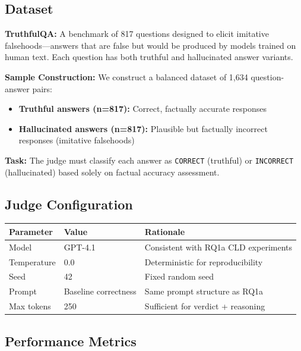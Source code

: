 \subsection{Dataset}

\textbf{TruthfulQA:} A benchmark of 817 questions designed to elicit imitative falsehoods---answers that are false but would be produced by models trained on human text. Each question has both truthful and hallucinated answer variants.

\textbf{Sample Construction:} We construct a balanced dataset of 1,634 question-answer pairs:
\begin{itemize}[noitemsep]
    \item \textbf{Truthful answers (n=817):} Correct, factually accurate responses
    \item \textbf{Hallucinated answers (n=817):} Plausible but factually incorrect responses (imitative falsehoods)
\end{itemize}

\textbf{Task:} The judge must classify each answer as \texttt{CORRECT} (truthful) or \texttt{INCORRECT} (hallucinated) based solely on factual accuracy assessment.

\subsection{Judge Configuration}

\begin{table}[H]
\centering
\footnotesize
\begin{tabular}{@{}l l l@{}}
\toprule
\textbf{Parameter} & \textbf{Value} & \textbf{Rationale} \\
\midrule
Model & GPT-4.1 & Consistent with RQ1a CLD experiments \\
Temperature & 0.0 & Deterministic for reproducibility \\
Seed & 42 & Fixed random seed \\
Prompt & Baseline correctness & Same prompt structure as RQ1a \\
Max tokens & 250 & Sufficient for verdict + reasoning \\
\bottomrule
\end{tabular}
\end{table}

\subsection{Performance Metrics}


